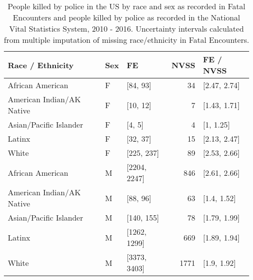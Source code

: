 \begin{table}[ht]
\centering
\caption{People killed by police in the US by race and sex as recorded in Fatal Encounters and people killed by police as recorded in the National Vital Statistics System, 2010 - 2016. Uncertainty intervals calculated from multiple imputation of missing race/ethnicity in Fatal Encounters.} 
\begin{tabular}{lllrl}
  \hline
Race / Ethnicity & Sex & FE & NVSS & FE / NVSS \\ 
  \hline
African American & F & [84, 93] &  34 & [2.47, 2.74] \\ 
  American Indian/AK Native & F & [10, 12] &   7 & [1.43, 1.71] \\ 
  Asian/Pacific Islander & F & [4, 5] &   4 & [1, 1.25] \\ 
  Latinx & F & [32, 37] &  15 & [2.13, 2.47] \\ 
  White & F & [225, 237] &  89 & [2.53, 2.66] \\ 
  African American & M & [2204, 2247] & 846 & [2.61, 2.66] \\ 
  American Indian/AK Native & M & [88, 96] &  63 & [1.4, 1.52] \\ 
  Asian/Pacific Islander & M & [140, 155] &  78 & [1.79, 1.99] \\ 
  Latinx & M & [1262, 1299] & 669 & [1.89, 1.94] \\ 
  White & M & [3373, 3403] & 1771 & [1.9, 1.92] \\ 
   \hline
\end{tabular}
\end{table}
